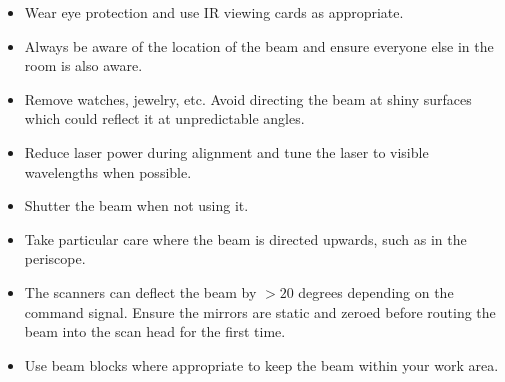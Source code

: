 \documentclass[a4paper]{report}
\begin{document}
\begin{itemize}
    \item Wear eye protection and use IR viewing cards as appropriate.
    \item Always be aware of the location of the beam and ensure everyone else in the room is also aware.
    \item Remove watches, jewelry, etc. Avoid directing the beam at shiny surfaces which could reflect it at unpredictable angles.
    \item Reduce laser power during alignment and tune the laser to visible wavelengths when possible.
    \item Shutter the beam when not using it. 
    \item Take particular care where the beam is directed upwards, such as in the periscope. 
    \item The scanners can deflect the beam by $>20$ degrees depending on the command signal. Ensure the mirrors are static and zeroed before routing the beam into the scan head for the first time. 
    \item Use beam blocks where appropriate to keep the beam within your work area.
\end{itemize}

\clearpage
\end{document}

